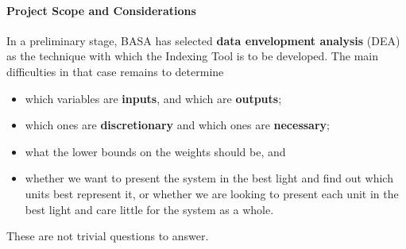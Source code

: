 \paragraph{Project Scope and Considerations}
In a preliminary stage, BASA has selected \textbf{data envelopment analysis} (DEA) as the technique with which the Indexing Tool is to be developed. The main difficulties in that case remains to determine
\begin{itemize}[noitemsep]
\item which variables are \textbf{inputs}, and which are \textbf{outputs};
\item which ones are \textbf{discretionary} and which ones are \textbf{necessary};
\item what the lower bounds on the weights should be, and 
\item whether we want to present the system in the best light and find out which units best represent it, or whether we are looking to present each unit in the best light and care little for the system as a whole.
\end{itemize}
These are not trivial questions to answer. 
